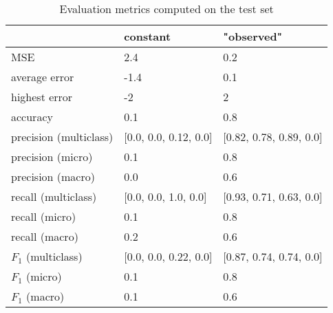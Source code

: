 \begin{table}[h]
\caption{Evaluation metrics computed on the test set}
\label{tbl:sais_eval_test}
\begin{tabular}{lll}
\toprule
 & constant & "observed" \\
\midrule
MSE & 2.4 & 0.2 \\
average error & -1.4 & 0.1 \\
highest error & -2 & 2 \\
accuracy & 0.1 & 0.8 \\
precision (multiclass) & [0.0, 0.0, 0.12, 0.0] & [0.82, 0.78, 0.89, 0.0] \\
precision (micro) & 0.1 & 0.8 \\
precision (macro) & 0.0 & 0.6 \\
recall (multiclass) & [0.0, 0.0, 1.0, 0.0] & [0.93, 0.71, 0.63, 0.0] \\
recall (micro) & 0.1 & 0.8 \\
recall (macro) & 0.2 & 0.6 \\
$F_1$ (multiclass) & [0.0, 0.0, 0.22, 0.0] & [0.87, 0.74, 0.74, 0.0] \\
$F_1$ (micro) & 0.1 & 0.8 \\
$F_1$ (macro) & 0.1 & 0.6 \\
\bottomrule
\end{tabular}
\end{table}
